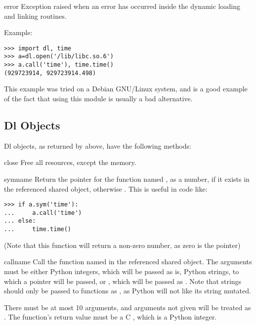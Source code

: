 \begin{excdesc}{error}
Exception raised when an error has occurred inside the dynamic loading
and linking routines.
\end{excdesc}

Example:

\begin{verbatim}
>>> import dl, time
>>> a=dl.open('/lib/libc.so.6')
>>> a.call('time'), time.time()
(929723914, 929723914.498)
\end{verbatim}

This example was tried on a Debian GNU/Linux system, and is a good
example of the fact that using this module is usually a bad alternative.

\subsection{Dl Objects \label{dl-objects}}

Dl objects, as returned by  above, have the
following methods:

\begin{methoddesc}{close}{}
Free all resources, except the memory.
\end{methoddesc}

\begin{methoddesc}{sym}{name}
Return the pointer for the function named , as a number, if
it exists in the referenced shared object, otherwise . This
is useful in code like:

\begin{verbatim}
>>> if a.sym('time'): 
...     a.call('time')
... else: 
...     time.time()
\end{verbatim}

(Note that this function will return a non-zero number, as zero is the
\NULL{} pointer)
\end{methoddesc}

\begin{methoddesc}{call}{name}
Call the function named  in the referenced shared object.
The arguments must be either Python integers, which will be 
passed as is, Python strings, to which a pointer will be passed, 
or , which will be passed as \NULL.  Note that 
strings should only be passed to functions as , as
Python will not like its string mutated.

There must be at most 10 arguments, and arguments not given will be
treated as . The function's return value must be a C
, which is a Python integer.
\end{methoddesc}
